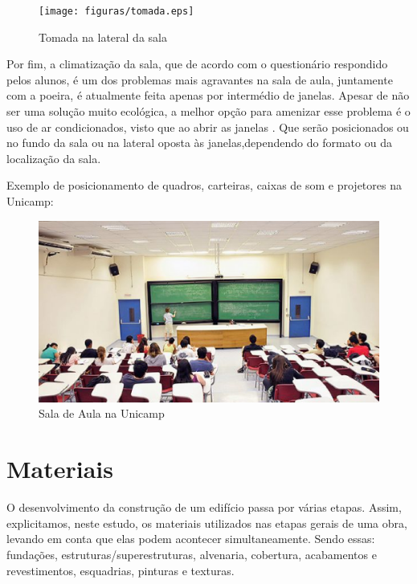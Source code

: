  \begin{figure}[!h]
 	\centering
\texttt{[image: figuras/tomada.eps]}
 	\caption{Tomada na lateral da sala}
 	\label{fig02242}
\end{figure}

Por fim, a climatização da sala, que de acordo com o questionário respondido pelos alunos, é um dos problemas mais agravantes na sala de aula, juntamente com a poeira, é atualmente feita apenas por intermédio de janelas. Apesar de não ser uma solução muito ecológica, a melhor opção para amenizar esse problema é o uso de ar condicionados, visto que ao abrir as janelas . Que serão posicionados ou no fundo da sala ou na lateral oposta às janelas,dependendo do formato ou da localização da sala.

Exemplo de posicionamento de quadros, carteiras, caixas de som e projetores na Unicamp:

 \begin{figure}[!h]
 	\centering
\includegraphics[keepaspectratio=true,scale=0.7]{figuras/unicamp.eps}
 	\caption{Sala de Aula na Unicamp}
 	\label{fig02242}
\end{figure}

\section{Materiais}
O desenvolvimento da construção de um edifício passa por várias etapas. Assim, explicitamos, neste estudo, os materiais utilizados nas etapas gerais de uma obra, levando em conta que elas podem acontecer simultaneamente. Sendo essas: fundações, estruturas/superestruturas, alvenaria, cobertura, acabamentos e revestimentos, esquadrias, pinturas e texturas.

